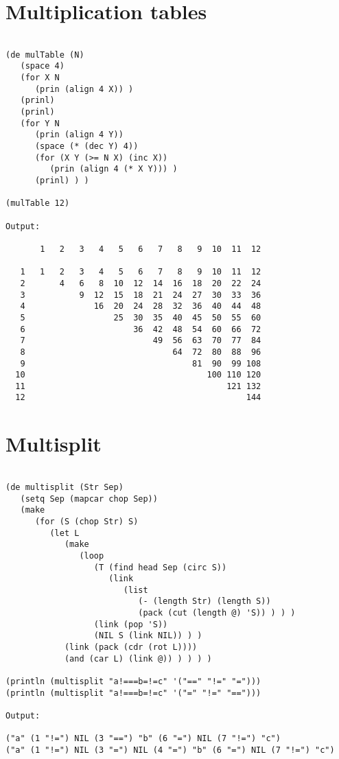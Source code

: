\section*{Multiplication tables}

\begin{verbatim}

(de mulTable (N)
   (space 4)
   (for X N
      (prin (align 4 X)) )
   (prinl)
   (prinl)
   (for Y N
      (prin (align 4 Y))
      (space (* (dec Y) 4))
      (for (X Y (>= N X) (inc X))
         (prin (align 4 (* X Y))) )
      (prinl) ) )

(mulTable 12)

Output:

       1   2   3   4   5   6   7   8   9  10  11  12

   1   1   2   3   4   5   6   7   8   9  10  11  12
   2       4   6   8  10  12  14  16  18  20  22  24
   3           9  12  15  18  21  24  27  30  33  36
   4              16  20  24  28  32  36  40  44  48
   5                  25  30  35  40  45  50  55  60
   6                      36  42  48  54  60  66  72
   7                          49  56  63  70  77  84
   8                              64  72  80  88  96
   9                                  81  90  99 108
  10                                     100 110 120
  11                                         121 132
  12                                             144

\end{verbatim}

\section*{Multisplit}

\begin{verbatim}

(de multisplit (Str Sep)
   (setq Sep (mapcar chop Sep))
   (make
      (for (S (chop Str) S)
         (let L
            (make
               (loop
                  (T (find head Sep (circ S))
                     (link
                        (list
                           (- (length Str) (length S))
                           (pack (cut (length @) 'S)) ) ) )
                  (link (pop 'S))
                  (NIL S (link NIL)) ) )
            (link (pack (cdr (rot L))))
            (and (car L) (link @)) ) ) ) )

(println (multisplit "a!===b=!=c" '("==" "!=" "=")))
(println (multisplit "a!===b=!=c" '("=" "!=" "==")))

Output:

("a" (1 "!=") NIL (3 "==") "b" (6 "=") NIL (7 "!=") "c")
("a" (1 "!=") NIL (3 "=") NIL (4 "=") "b" (6 "=") NIL (7 "!=") "c")

\end{verbatim}

